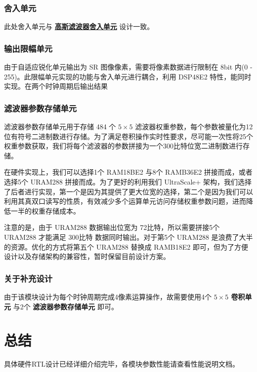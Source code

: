 \documentclass[12pt, a4paper, oneside]{ctexbook}
\begin{document}
	\subsection{舍入单元}
	此处舍入单元与 \hyperref[round_unit]{\textbf{高斯滤波器舍入单元}} 设计一致。		
	\subsection{输出限幅单元}
	由于自适应锐化单元输出为 SR 图像像素，需要将像素数据进行限制在 8bit 内(0 - 255)。此限幅单元实现的功能与舍入单元进行耦合，利用 DSP48E2 特性，能同时实现。在两个时钟周期后输出结果
	\subsection{滤波器参数存储单元}
	滤波器参数存储单元用于存储 484 个 $5\times5$ 滤波器权重参数，每个参数被量化为12位有符号二进制数进行存储。为了满足卷积操作实时性要求，尽可能一次性将25个权重参数获取，我们将每个滤波器的参数拼接为一个300比特位宽二进制数进行存储。\par 在硬件实现上，我们可以选择1个 RAM18BE2 与8个 RAMB36E2 拼接而成，或者选择5个 URAM288 拼接而成。为了更好的利用我们 UltraScale+ 架构，我们选择了后者进行实现，第一个是因为其提供了更大位宽的选择，第二个是因为我们可以利用其真双口读写的性质，有效减少多个运算单元访问存储权重参数问题，进而降低一半的权重存储成本。\par 注意的是，由于 URAM288 数据输出位宽为 72比特，所以需要拼接5个 URAM288 才能满足 300比特 数据同时输出。对于第5个 URAM288 是浪费了大半的资源。优化的方式将第五个 URAM288 替换成 RAMB18E2 即可，但为了方便设计以及存储架构的兼容性，暂时保留目前设计方案。
	\subsection{关于补充设计} 
	由于该模块设计为每个时钟周期完成4像素运算操作，故需要使用4个 \textbf{ $5\times5$ 卷积单元} 与2个 \textbf{滤波器参数存储单元} 即可。
	
	\chapter{总结}
	具体硬件RTL设计已经详细介绍完毕，各模块参数性能请查看性能说明文档。
	
\end{document}
